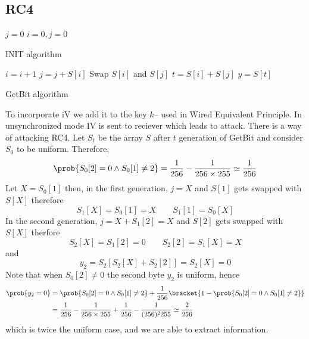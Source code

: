 \subsection{RC4}
\begin{algorithm}
    \DontPrintSemicolon
    \(j = 0\)\;
    \(i = 0, j = 0\)\;
    \caption{INIT algorithm}
\end{algorithm}

\begin{algorithm}
    \DontPrintSemicolon
    \(i = i + 1\)\; 
    \(j = j + S[i]\)\;
    Swap \(S[i]\) and \(S[j]\)\;
    \(t = S[i] + S[j]\)
    \(y = S[t]\)
    \caption{GetBit algorithm}
\end{algorithm}
To incorporate iV we add it to the key \(k\)-- used in Wired Equivalent Principle. In unsynchronized mode IV is sent to reciever which leads to attack. 
There is a way of attacking RC4. Let \(S_t\) be the array \(S\) after \(t\) generation of GetBit and consider \(S_0\) to be uniform. Therefore, 
\begin{equation*}
    \prob{S_0[2] = 0 \land S_0[1] \neq 2} = \dfrac{1}{256} - \dfrac{1}{256 \times 255} \simeq \dfrac{1}{256}
\end{equation*}
Let \(X = S_0[1]\) then, in the first generation, \(j = X\) and \(S[1]\) gets swapped with \(S[X]\) therefore 
\begin{equation*}
    S_1[X] = S_0[1] = X \qquad S_1[1] = S_0[X]
\end{equation*}
In the second generation, \(j = X + S_1[2] = X\) and \(S[2]\) gets swapped with \(S[X]\) therfore 
\begin{equation*}
    S_2[X] = S_1[2] = 0 \qquad S_2[2] = S_1[X] = X
\end{equation*}
and 
\begin{equation*}
    y_2 = S_2[S_2[X] + S_2[2]] = S_2[X] = 0
\end{equation*}
Note that when \(S_0[2] \neq 0\) the second byte \(y_2\) is uniform, hence 
\begin{align*}
    \prob{y_2 = 0} &= \prob{S_0[2] = 0 \land S_0[1] \neq 2} + \dfrac{1}{256} \bracket{1 - \prob{S_0[2] = 0 \land S_0[1] \neq 2}}\\
    &= \dfrac{1}{256} - \dfrac{1}{256 \times 255} + \dfrac{1}{256} - \dfrac{1}{(256)^2 255} \simeq \dfrac{2}{256}  
\end{align*}
which is twice the uniform case, and we are able to extract information.